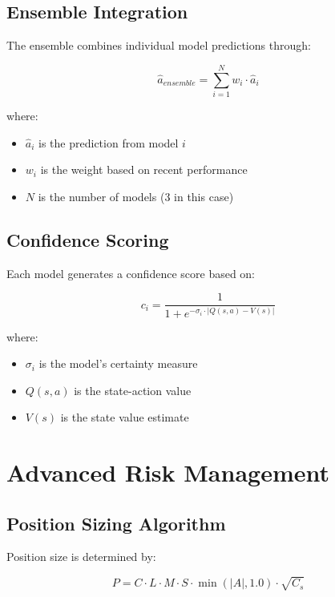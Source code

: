 \documentclass[11pt,a4paper]{article}
\begin{document}
\subsection{Ensemble Integration}

The ensemble combines individual model predictions through:

\begin{equation}
\hat{a}_{ensemble} = \sum_{i=1}^{N} w_i \cdot \hat{a}_i
\label{eq:ensemble_prediction}
\end{equation}

where:
\begin{itemize}
    \item $\hat{a}_i$ is the prediction from model $i$
    \item $w_i$ is the weight based on recent performance
    \item $N$ is the number of models (3 in this case)
\end{itemize}

\subsection{Confidence Scoring}

Each model generates a confidence score based on:

\begin{equation}
c_i = \frac{1}{1 + e^{-\sigma_i \cdot |Q(s,a) - V(s)|}}
\label{eq:confidence_score}
\end{equation}

where:
\begin{itemize}
    \item $\sigma_i$ is the model's certainty measure
    \item $Q(s,a)$ is the state-action value
    \item $V(s)$ is the state value estimate
\end{itemize}

\section{Advanced Risk Management}

\subsection{Position Sizing Algorithm}

Position size is determined by:

\begin{equation}
P = C \cdot L \cdot M \cdot S \cdot \min(|A|, 1.0) \cdot \sqrt{C_s}
\label{eq:position_size}
\end{equation}
\end{document}

